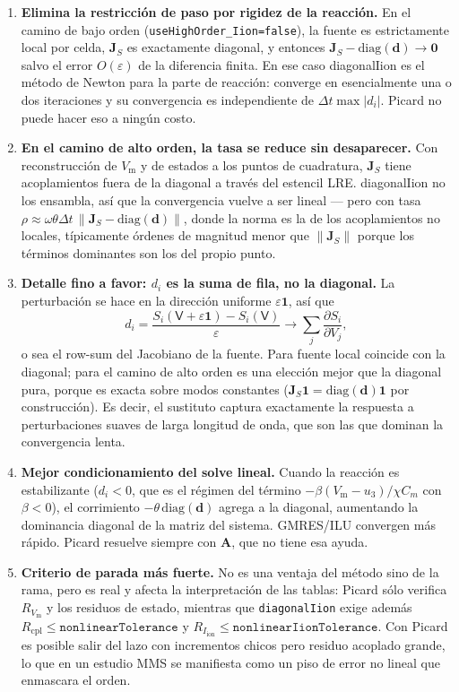 \documentclass[11pt,a4paper]{article}
\newcommand{\code}[1]{\texttt{\small #1}}
\newcommand{\Vm}{V_{\text{m}}}
\newcommand{\Iion}{I_{\mathrm{ion}}}
\newcommand{\Aimp}{\mathbf{A}}
\newcommand{\norm}[1]{\left\lVert #1 \right\rVert}
\begin{document}
\begin{enumerate}
\item \textbf{Elimina la restricción de paso por rigidez de la reacción.} En el camino de bajo orden (\code{useHighOrder\_Iion=false}), la fuente es estrictamente local por celda, $\mathbf{J}_S$ es exactamente diagonal, y entonces $\mathbf{J}_S-\mathrm{diag}(\mathbf{d})\to\mathbf{0}$ salvo el error $O(\varepsilon)$ de la diferencia finita. En ese caso diagonalIion es el método de Newton para la parte de reacción: converge en esencialmente una o dos iteraciones y su convergencia es independiente de $\Delta t\max|d_i|$. Picard no puede hacer eso a ningún costo.
\item \textbf{En el camino de alto orden, la tasa se reduce sin desaparecer.} Con reconstrucción de $\Vm$ y de estados a los puntos de cuadratura, $\mathbf{J}_S$ tiene acoplamientos fuera de la diagonal a través del estencil LRE. diagonalIion no los ensambla, así que la convergencia vuelve a ser lineal — pero con tasa $\rho\approx\omega\theta\Delta t\,\norm{\mathbf{J}_S-\mathrm{diag}(\mathbf{d})}$, donde la norma es la de los acoplamientos no locales, típicamente órdenes de magnitud menor que $\norm{\mathbf{J}_S}$ porque los términos dominantes son los del propio punto.
\item \textbf{Detalle fino a favor: $d_i$ es la suma de fila, no la diagonal.} La perturbación se hace en la dirección uniforme $\varepsilon\mathbf{1}$, así que $$d_i=\frac{S_i(\mathsf{V}+\varepsilon\mathbf{1})-S_i(\mathsf{V})}{\varepsilon}\longrightarrow\sum_j\frac{\partial S_i}{\partial V_j},$$ o sea el row-sum del Jacobiano de la fuente. Para fuente local coincide con la diagonal; para el camino de alto orden es una elección mejor que la diagonal pura, porque es exacta sobre modos constantes ($\mathbf{J}_S\mathbf{1}=\mathrm{diag}(\mathbf{d})\mathbf{1}$ por construcción). Es decir, el sustituto captura exactamente la respuesta a perturbaciones suaves de larga longitud de onda, que son las que dominan la convergencia lenta.
\item \textbf{Mejor condicionamiento del solve lineal.} Cuando la reacción es estabilizante ($d_i<0$, que es el régimen del término $-\beta(\Vm-u_3)/\chi C_m$ con $\beta<0$), el corrimiento $-\theta\,\mathrm{diag}(\mathbf{d})$ agrega a la diagonal, aumentando la dominancia diagonal de la matriz del sistema. GMRES/ILU convergen más rápido. Picard resuelve siempre con $\Aimp$, que no tiene esa ayuda.
\item \textbf{Criterio de parada más fuerte.} No es una ventaja del método sino de la rama, pero es real y afecta la interpretación de las tablas: Picard sólo verifica $R_{\Vm}$ y los residuos de estado, mientras que \code{diagonalIion} exige además $R_{\mathrm{cpl}}\le\texttt{nonlinearTolerance}$ y $R_{\Iion}\le\texttt{nonlinearIionTolerance}$. Con Picard es posible salir del lazo con incrementos chicos pero residuo acoplado grande, lo que en un estudio MMS se manifiesta como un piso de error no lineal que enmascara el orden. 
\end{enumerate}
\end{document}

